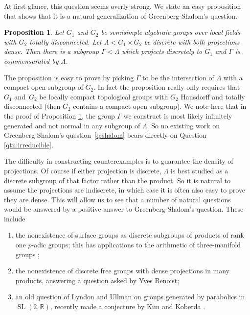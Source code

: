 \documentclass[JEP,XML,SOM,Unicode,published]{cedram}
\newcommand{\bbR}{\ensuremath{\mathbb{R}}}
\DeclareMathOperator{\SL}{SL}
\newtheorem{prop}[thm]{Proposition}
\theoremstyle{definition}
\begin{document}
At first glance, this question seems overly strong. We state an easy proposition that shows that it is a natural
generalization of Greenberg-Shalom's question.

\begin{prop}
\label{prop:shalomtoirreducible}
Let $G_1$ and $G_2$ be semisimple algebraic groups over local fields with $G_2$ totally disconnected. Let $\Lambda < G_1 \times G_2$ be discrete with both projections dense. Then there is a subgroup $\Gamma <\Lambda$ which projects discretely to $G_1$
and $\Gamma$ is commensurated by $\Lambda$.
\end{prop}

The proposition is easy to prove by picking $\Gamma$ to be the intersection of $\Lambda$ with a compact open subgroup
of $G_2$. In fact the proposition really only requires that~$G_1$ and~$G_2$ be locally compact topological groups with
$G_2$ Hausdorff and totally disconnected (then $G_2$ contains a compact open subgroup). We note here that in the proof of
Proposition \ref{prop:shalomtoirreducible}, the group $\Gamma$ we construct is most likely infinitely generated and
not normal in any subgroup of $\Lambda$. So no existing work on Greenberg-Shalom's question~\ref{q:shalom} bears directly on Question \ref{qtn:irreducible}.

The difficulty in constructing counterexamples is to guarantee the density of projections. Of course if either
projection is discrete, $\Lambda$ is best studied as a discrete subgroup of that factor rather than the product. So it is natural to assume the projections are indiscrete, in which case it is often also easy to prove they are dense. This will allow
us to see that a number of natural questions would be answered by a positive answer to Greenberg-Shalom's question. These include

\begin{enumerate}
\item the nonexistence of surface groups as discrete subgroups of products of rank one $p$-adic groups; this has applications to the arithmetic of three-manifold groups \cite{FLSS};
\item the nonexistence of discrete free groups with dense projections in many products, answering a question asked by Yves Benoist;
\item an old question of Lyndon and Ullman on groups generated by parabolics in $\SL(2,\bbR)$, recently made a conjecture by Kim and Koberda \cite{lyndon-ullman, kim-koberda-notfree}.
\end{enumerate}
\end{document}
